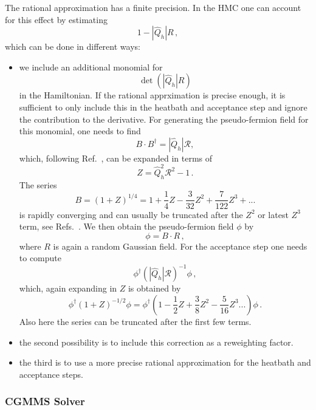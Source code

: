 The rational approximation has a finite precision. In the HMC one can
account for this effect by estimating
\[
1 - |\hat Q_h| R\,,
\]
which can be done in different ways:
\begin{itemize}
\item we include an additional monomial for
  \[
  \det (|\hat Q_h| R)
  \]
  in the Hamiltonian. If the rational apprximation is precise enough,
  it is sufficient to only include this in the heatbath and acceptance
  step and ignore the contribution to the derivative. For generating
  the pseudo-fermion field for this monomial, one needs to find
  \[
  B\cdot B^\dagger = |\hat Q_h| \mathcal{R},
  \]
  which, following Ref.~\cite{Luscher:2010ae}, can be expanded in
  terms of
  \[
  Z = \hat Q_h^2\mathcal{R}^2 -1\,.
  \]
  The series
  \[
  B = (1+Z)^{1/4} =  1 + \frac{1}{4} Z - \frac{3}{32} Z^2 + \frac{7}{122} Z^3 + ...
  \]
  is rapidly converging and can usually be truncated after the $Z^2$
  or latest $Z^3$ term, see
  Refs.~\cite{Luscher:2010ae,Luscher:2012av}. We then obtain the
  pseudo-fermion field $\phi$ by
  \[
  \phi = B\cdot R\,,
  \]
  where $R$ is again a random Gaussian field. For the acceptance step
  one needs to compute
  \[
  \phi^\dagger (|\hat Q_h|\mathcal{R})^{-1}\phi\,,
  \]
  which, again expanding in $Z$ is obtained by
  \[
  \phi^\dagger (1+Z)^{-1/2} \phi = \phi^\dagger (1 - \frac{1}{2}Z +
  \frac{3}{8}Z^2 - \frac{5}{16}Z^3  ...) \phi\, .
  \]
  Also here the series can be truncated after the first few terms.
\item the second possibility is to include this correction as a
  reweighting factor.
\item the third is to use a more precise rational approximation for
  the heatbath and acceptance steps.
\end{itemize}

\subsubsection{CGMMS Solver}

